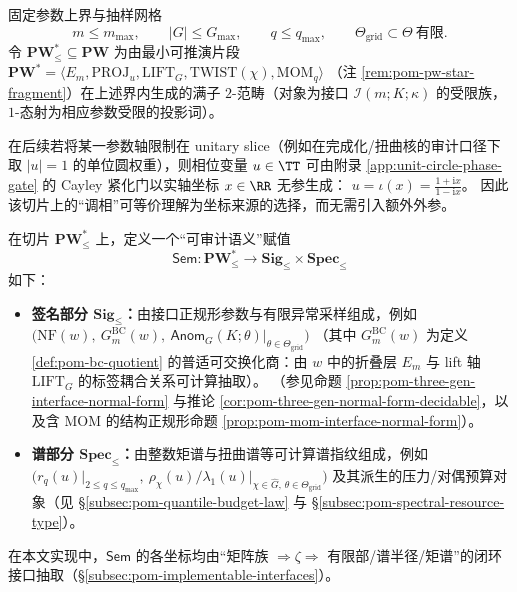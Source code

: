 \begin{definition}\label{def:pom-bounded-slice}
固定参数上界与抽样网格
\[
m\le m_{\max},\qquad |G|\le G_{\max},\qquad q\le q_{\max},\qquad \Theta_{\mathrm{grid}}\subset\Theta\ \text{有限}.
\]
令 \(\mathbf{PW}^{\ast}_{\le}\subseteq\mathbf{PW}\) 为由最小可推演片段
\(\mathbf{PW}^{\ast}=\langle E_m,\mathrm{PROJ}_u,\mathrm{LIFT}_G,\mathrm{TWIST}(\chi),\mathrm{MOM}_q\rangle\)
（注 \ref{rem:pom-pw-star-fragment}）在上述界内生成的满子 \(2\)-范畴（对象为接口 \(\mathcal{I}(m;K;\kappa)\) 的受限族，\(1\)-态射为相应参数受限的投影词）。
\end{definition}

\begin{remark}\label{rem:pom-unitary-slice-param-by-real-line}
在后续若将某一参数轴限制在 unitary slice（例如在完成化/扭曲核的审计口径下取 \(|u|=1\) 的单位圆权重），则相位变量 \(u\in\TT\) 可由附录 \ref{app:unit-circle-phase-gate} 的 Cayley 紧化门以实轴坐标 \(x\in\RR\) 无参生成：
\(
u=\iota(x)=\frac{1+\mathrm{i}x}{1-\mathrm{i}x}
\)。
因此该切片上的“调相”可等价理解为坐标来源的选择，而无需引入额外外参。
\end{remark}

\begin{definition}\label{def:pom-sem-functor}
在切片 \(\mathbf{PW}^{\ast}_{\le}\) 上，定义一个“可审计语义”赋值
\[
\mathsf{Sem}:\mathbf{PW}^{\ast}_{\le}\longrightarrow \mathbf{Sig}_{\le}\times \mathbf{Spec}_{\le}
\]
如下：
\begin{itemize}
  \item \textbf{签名部分 \(\mathbf{Sig}_{\le}\)：}由接口正规形参数与有限异常采样组成，例如
  \(\bigl(\mathrm{NF}(w),\ G^{\mathrm{BC}}_m(w),\ \mathsf{Anom}_{G}(K;\theta)\vert_{\theta\in\Theta_{\mathrm{grid}}}\bigr)\)
  （其中 \(G^{\mathrm{BC}}_m(w)\) 为定义 \ref{def:pom-bc-quotient} 的普适可交换化商：由 \(w\) 中的折叠层 \(E_m\) 与 lift 轴 \(\mathrm{LIFT}_G\) 的标签耦合关系可计算抽取）。
  （参见命题 \ref{prop:pom-three-gen-interface-normal-form} 与推论 \ref{cor:pom-three-gen-normal-form-decidable}，以及含 \(\mathrm{MOM}\) 的结构正规形命题 \ref{prop:pom-mom-interface-normal-form}）。
  \item \textbf{谱部分 \(\mathbf{Spec}_{\le}\)：}由整数矩谱与扭曲谱等可计算谱指纹组成，例如
  \(\bigl(r_q(u)\vert_{2\le q\le q_{\max}},\ \rho_\chi(u)/\lambda_1(u)\vert_{\chi\in\widehat G,\,\theta\in\Theta_{\mathrm{grid}}}\bigr)\)
  及其派生的压力/对偶预算对象（见 \S\ref{subsec:pom-quantile-budget-law} 与 \S\ref{subsec:pom-spectral-resource-type}）。
\end{itemize}
在本文实现中，\(\mathsf{Sem}\) 的各坐标均由“矩阵族 \(\Rightarrow\zeta\Rightarrow\) 有限部/谱半径/矩谱”的闭环接口抽取（\S\ref{subsec:pom-implementable-interfaces}）。
\end{definition}

